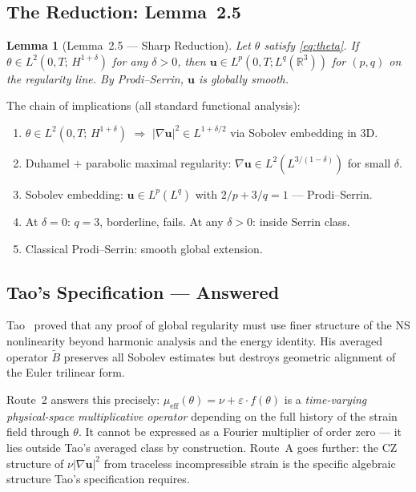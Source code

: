 \documentclass[11pt, a4paper]{article}
\newtheorem{lemma}[theorem]{Lemma}
\theoremstyle{definition}
\theoremstyle{remark}
\newcommand{\R}{\mathbb{R}}
\newcommand{\eps}{\varepsilon}
\newcommand{\thet}{\theta}
\newcommand{\mueff}{\mu_{\mathrm{eff}}}
\newcommand{\delt}{\delta}
\newcommand{\LtHs}[1]{L^2(0,T;\,H^{#1})}
\begin{document}
\subsection{The Reduction: Lemma~2.5}

\begin{lemma}[Lemma~2.5 --- Sharp Reduction]
\label{lem:25}
  Let $\thet$ satisfy \eqref{eq:theta}. If $\thet \in \LtHs{1+\delt}$ for any
  $\delt > 0$, then $\mathbf{u} \in L^p(0,T;L^q(\R^3))$ for $(p,q)$ on the
  regularity line. By Prodi--Serrin, $\mathbf{u}$ is globally smooth.
\end{lemma}

The chain of implications (all standard functional analysis):
\begin{enumerate}
  \item $\thet \in \LtHs{1+\delt}$ $\Rightarrow$ $|\nabla\mathbf{u}|^2 \in L^{1+\delt/2}$
        via Sobolev embedding in 3D.
  \item Duhamel $+$ parabolic maximal regularity:
        $\nabla\mathbf{u} \in L^2(L^{3/(1-\delt)})$ for small $\delt$.
  \item Sobolev embedding: $\mathbf{u} \in L^p(L^q)$ with $2/p + 3/q = 1$ --- Prodi--Serrin.
  \item At $\delt = 0$: $q = 3$, borderline, fails. At any $\delt > 0$: inside Serrin class.
  \item Classical Prodi--Serrin: smooth global extension.
\end{enumerate}

\subsection{Tao's Specification --- Answered}

Tao~\cite{tao2016} proved that any proof of global regularity must use
finer structure of the NS nonlinearity beyond harmonic analysis and the
energy identity. His averaged operator $\tilde{B}$ preserves all Sobolev estimates
but destroys geometric alignment of the Euler trilinear form.

Route~2 answers this precisely: $\mueff(\thet) = \nu + \eps\cdot f(\thet)$ is a
\emph{time-varying physical-space multiplicative operator} depending on the full
history of the strain field through $\thet$. It cannot be expressed as a Fourier
multiplier of order zero --- it lies outside Tao's averaged class by construction.
Route~A goes further: the CZ structure of $\nu|\nabla\mathbf{u}|^2$ from traceless
incompressible strain is the specific algebraic structure Tao's specification requires.
\end{document}
